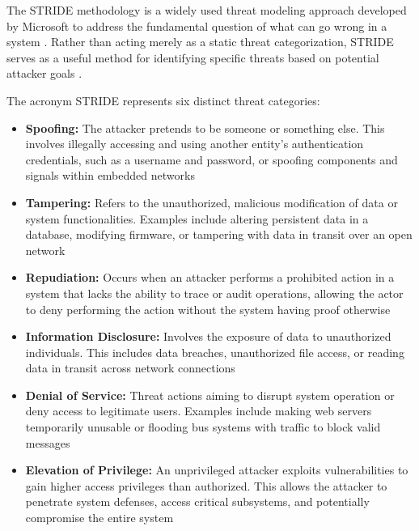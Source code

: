 The STRIDE methodology is a widely used threat modeling approach developed by Microsoft to address the fundamental question of what can go wrong in a system \cite{microsoft_stride_model} \cite[p. 143]{doCarmo2025}. Rather than acting merely as a static threat categorization, STRIDE serves as a useful method for identifying specific threats based on potential attacker goals \cite{owasp_threat_modeling_process, doCarmo2025}. 

The acronym STRIDE represents six distinct threat categories:

\begin{itemize}
	\item \textbf{Spoofing:} The attacker pretends to be someone or something else. This involves illegally accessing and using another entity's authentication credentials, such as a username and password, or spoofing components and signals within embedded networks
	
	\item \textbf{Tampering:} Refers to the unauthorized, malicious modification of data or system functionalities. Examples include altering persistent data in a database, modifying firmware, or tampering with data in transit over an open network 
	
	\item \textbf{Repudiation:} Occurs when an attacker performs a prohibited action in a system that lacks the ability to trace or audit operations, allowing the actor to deny performing the action without the system having proof otherwise
	
	\item \textbf{Information Disclosure:} Involves the exposure of data to unauthorized individuals. This includes data breaches, unauthorized file access, or reading data in transit across network connections 
	
	\item \textbf{Denial of Service:} Threat actions aiming to disrupt system operation or deny access to legitimate users. Examples include making web servers temporarily unusable or flooding bus systems with traffic to block valid messages 
	
	\item \textbf{Elevation of Privilege:} An unprivileged attacker exploits vulnerabilities to gain higher access privileges than authorized. This allows the attacker to penetrate system defenses, access critical subsystems, and potentially compromise the entire system \cite{microsoft_stride_model} \cite[p. 144]{doCarmo2025}
\end{itemize}


